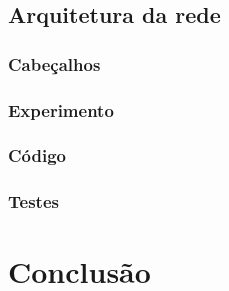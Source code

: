 \documentclass[12pt,
openright, 
oneside,
a4paper,
brazil]{facom-ufu-abntex2}
\begin{document}
\subsection{Arquitetura da rede}
\subsubsection{Cabeçalhos}
\subsubsection{Experimento}
\subsubsection{Código}
\subsubsection{Testes}

\section{Conclusão}





\end{document}
